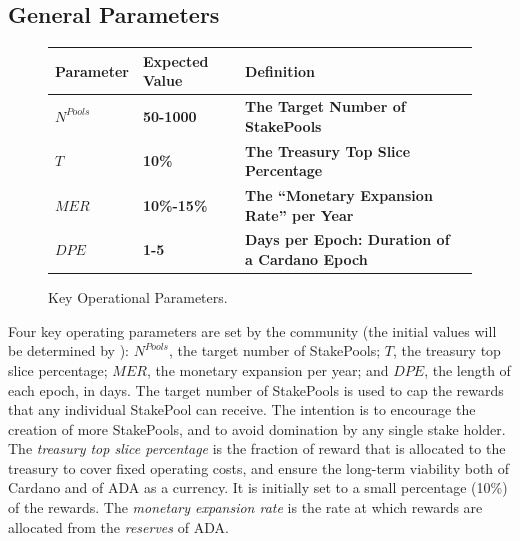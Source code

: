 \documentclass[11pt,a4paper,dvipsnames,twosided,final]{article}
\newcommand{\ada}{ADA{}}
\newcommand{\cardano}[1]{Cardano}
\begin{document}
\subsection{General Parameters}

\begin{figure}[h!]
\begin{center}
\begin{tabular}{||l|l|p{10cm}|l||}
  \hline \hline
\textbf{Parameter} & \textbf{Expected Value} & \textbf{Definition} \\\hline
\textbf{\color{green} $N^{\textit{Pools}}$} &\textbf{\color{green}  50-1000} & \textbf{\color{green} The Target Number of StakePools} \\\hline
\textbf{\color{green} $T$ } & \textbf{\color{green}  10\% } & \textbf{\color{green}  The Treasury Top Slice Percentage } \\\hline
\textbf{\color{green} $\textit{MER}$ } & \textbf{\color{green}  10\%-15\% } & \textbf{\color{green}   The ``Monetary Expansion Rate'' per Year } \\\hline
\textbf{\color{green} $\textit{DPE}$ } & \textbf{\color{green}  1-5 } & \textbf{\color{green}   Days per Epoch: Duration of a \cardano{} Epoch } \\\hline
  \hline
\end{tabular}
\end{center}
\caption{Key Operational Parameters.}
\end{figure}

\noindent
Four key operating parameters are set by the community (the initial values will be determined by \IOHK):
$N^{\textit{Pools}}$, the target number of StakePools;
$T$, the treasury top slice percentage;
$\textit{MER}$, the monetary expansion per year;
and
$\textit{DPE}$, the length of each epoch, in days.
%
The target number of StakePools is used to cap the rewards that any individual StakePool can receive. The intention is to encourage the creation of more StakePools, and to avoid domination by any single stake holder.
The \emph{treasury top slice percentage} is the fraction of reward that is allocated to the treasury to cover fixed operating costs, and
ensure the long-term viability both of \cardano{} and of \ada{} as a currency.  It is initially set to a small percentage (10\%) of the rewards.
The \emph{monetary expansion rate} is the rate at which rewards are allocated from the \emph{reserves} of \ada{}.
\end{document}
